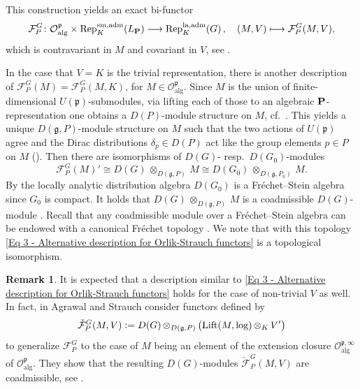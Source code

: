 \documentclass[a4paper, reqno, 10pt]{amsart}
\theoremstyle{definition}
\newtheorem{remark}[theorem]{Remark}
\numberwithin{equation}{section}
\newcommand{\botimes}[1]{{\,\otimes_{#1}\,}}
\newcommand{\defeq}{\vcentcolon=}
\newcommand{\la}{{\mathrm{la}}}
\newcommand{\lra}{\longrightarrow}
\newcommand{\lto}{\longmapsto}
\newcommand{\sm}{{\mathrm{sm}}}
\newcommand{\CF}{{\mathcal {F}}}
\newcommand{\CO}{{\mathcal {O}}}
\newcommand{\bP}{{\mathrm{\bf P}}}
\newcommand{\Fg}{{\mathfrak {g}}}
\newcommand{\Fp}{{\mathfrak {p}}}
\newcommand{\alg}{{\mathrm{alg}}}
\begin{document}
This construction yields an exact bi-functor 
\begin{equation*}
	\CF^G_P \colon \CO^\Fp_\alg \times {\rm Rep}_K^{\sm, {\rm adm}}(L_\bP) \lra {\rm Rep}_K^{\la,{\rm adm}}(G) \,,\quad (M,V) \lto \CF_P^G(M,V) ,
\end{equation*}
which is contravariant in $M$ and covariant in $V$, see \cite[Prop.\ 4.7]{OrlikStrauch15JordanHoelderSerLocAnRep}.



In the case that $V = K$ is the trivial representation, there is another description of $\CF^G_P(M) = \CF^G_P(M,K)$, for $M \in \CO_\alg^\Fp$.
Since $M$ is the union of finite-dimensional $U(\Fp)$-submodules, via lifting each of those to an algebraic $\bP$-representation one obtains a $D(P)$-module structure on $M$, cf.\ \cite[\S 3.4]{OrlikStrauch15JordanHoelderSerLocAnRep}.
This yields a unique $D(\Fg,P)$-module structure on $M$ such that the two actions of $U(\Fp)$ agree and the Dirac distributions $\delta_p \in D(P)$ act like the group elements $p\in P$ on $M$ (\cite[Cor.\ 3.6]{OrlikStrauch15JordanHoelderSerLocAnRep}).
Then there are isomorphisms of $D(G)$- resp.\ $D(G_0)$-modules \cite[Prop.\ 3.7]{OrlikStrauch15JordanHoelderSerLocAnRep}
\begin{equation}\label{Eq 3 - Alternative description for Orlik-Strauch functors}
	\CF^G_P (M)' \cong D(G) \botimes{D(\Fg,P)} M \cong D(G_0) \botimes{D(\Fg,P_0)} M .
\end{equation}
By \cite[Thm.\ 5.1]{SchneiderTeitelbaum03AlgpAdicDistAdmRep} the locally analytic distribution algebra $D(G_0)$ is a Fr\'echet--Stein algebra since $G_0$ is compact.
It holds that $D(G) \botimes{D(\Fg,P)} M$ is a coadmissible $D(G)$-module \cite[Prop.\ 3.7]{OrlikStrauch15JordanHoelderSerLocAnRep}.
Recall that any coadmissible module over a Fr\'echet--Stein algebra can be endowed with a canonical Fr\'echet topology \cite[\S 3]{SchneiderTeitelbaum03AlgpAdicDistAdmRep}.
We note that with this topology \eqref{Eq 3 - Alternative description for Orlik-Strauch functors} is a topological isomorphism.




\begin{remark}
	It is expected that a description similar to \eqref{Eq 3 - Alternative description for Orlik-Strauch functors} holds for the case of non-trivial $V$ as well.
	In fact, in \cite{AgrawalStrauch22FromCatOLocAnRep} Agrawal and Strauch consider functors defined by 
	\begin{equation*}
		\check{\CF}_P^G (M,V) \defeq D(G) \botimes{D(\Fg,P)} \big({\rm Lift}(M,\log) \botimes{K} V' \big)
	\end{equation*}
	to generalize $\CF_P^G$ to the case of $M$ being an element of the extension closure $\CO_\alg^{\Fp,\infty}$ of $\CO_\alg^{\Fp}$.
	They show that the resulting $D(G)$-modules $\check{\CF}_P^G (M,V)$ are coadmissible, see \cite[Thm.\ 4.2.3]{AgrawalStrauch22FromCatOLocAnRep}.
\end{remark}
\end{document}
